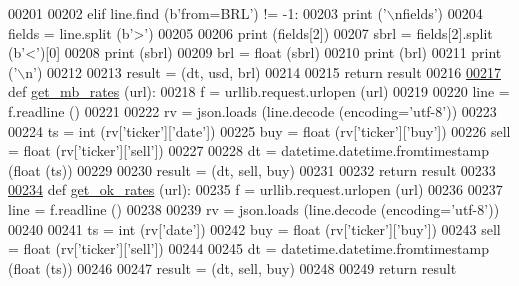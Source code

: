 \begin{DoxyCode}
00201         
00202         \textcolor{keywordflow}{elif} line.find (b\textcolor{stringliteral}{'from=BRL'}) != -1:
00203             \textcolor{keywordflow}{print} (\textcolor{stringliteral}{'\(\backslash\)nfields'})
00204             fields = line.split (b\textcolor{stringliteral}{'>'})
00205             
00206             \textcolor{keywordflow}{print} (fields[2])
00207             sbrl = fields[2].split (b\textcolor{stringliteral}{'<'})[0]
00208             \textcolor{keywordflow}{print} (sbrl)
00209             brl = float (sbrl)
00210             \textcolor{keywordflow}{print} (brl)
00211             \textcolor{keywordflow}{print} (\textcolor{stringliteral}{'\(\backslash\)n'})
00212             
00213     result = (dt, usd, brl)
00214     
00215     \textcolor{keywordflow}{return} result
00216 
\hyperlink{namespaceraw__urlparser_ae2341143e866401a993a5a964610f7a6}{00217} \textcolor{keyword}{def }\hyperlink{namespaceraw__urlparser_ae2341143e866401a993a5a964610f7a6}{get\_mb\_rates} (url):
00218     f = urllib.request.urlopen (url)
00219     
00220     line = f.readline ()
00221     
00222     rv = json.loads (line.decode (encoding=\textcolor{stringliteral}{'utf-8'}))
00223     
00224     ts   = int   (rv[\textcolor{stringliteral}{'ticker'}][\textcolor{stringliteral}{'date'}])
00225     buy  = float (rv[\textcolor{stringliteral}{'ticker'}][\textcolor{stringliteral}{'buy'}])
00226     sell = float (rv[\textcolor{stringliteral}{'ticker'}][\textcolor{stringliteral}{'sell'}])
00227     
00228     dt = datetime.datetime.fromtimestamp (float (ts))
00229     
00230     result = (dt, sell, buy)
00231     
00232     \textcolor{keywordflow}{return} result
00233 
\hyperlink{namespaceraw__urlparser_aaf342c097e3df48d46b7296e8177d737}{00234} \textcolor{keyword}{def }\hyperlink{namespaceraw__urlparser_aaf342c097e3df48d46b7296e8177d737}{get\_ok\_rates} (url):
00235     f = urllib.request.urlopen (url)
00236     
00237     line = f.readline ()
00238     
00239     rv = json.loads (line.decode (encoding=\textcolor{stringliteral}{'utf-8'}))
00240     
00241     ts   = int   (rv[\textcolor{stringliteral}{'date'}])
00242     buy  = float (rv[\textcolor{stringliteral}{'ticker'}][\textcolor{stringliteral}{'buy'}])
00243     sell = float (rv[\textcolor{stringliteral}{'ticker'}][\textcolor{stringliteral}{'sell'}])
00244     
00245     dt = datetime.datetime.fromtimestamp (float (ts))
00246     
00247     result = (dt, sell, buy)
00248     
00249     \textcolor{keywordflow}{return} result

\end{DoxyCode}
